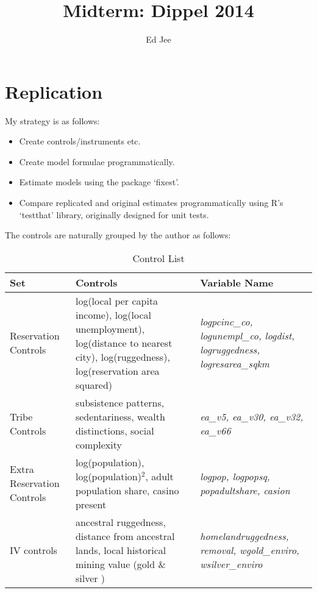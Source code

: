 \documentclass{article}
\author{Ed Jee}
\title{Midterm: Dippel 2014}
\begin{document}
\maketitle

\section{Replication}
My strategy is as follows:

\begin{itemize}
    \item Create controls/instruments etc.
    \item Create model formulae programmatically.
    \item Estimate models using the package `fixest'.
    \item Compare replicated and original estimates programmatically using
    R's `testthat' library, originally designed for unit tests.  
\end{itemize}

The controls are naturally grouped by the author as follows:

\begin{table}[htbp]
    \centering\begin{tabular}{| m{4cm} | m{5cm} | m{5cm} | }
        \hline 
    Set & Controls  & Variable Name\\ \hline\hline
    Reservation Controls & log(local per capita  income),
    log(local unemployment),
    log(distance to nearest city),
    log(ruggedness),
    log(reservation area squared) &
    \textit{
        logpcinc\_co,
        logunempl\_co,
        logdist,
        logruggedness,
        logresarea\_sqkm
    }  \\  \hline
    Tribe Controls & subsistence patterns,
    sedentariness,
    wealth distinctions,
    social complexity &
    \textit{
        ea\_v5,
        ea\_v30,
        ea\_v32,
        ea\_v66
    }\\ \hline
    Extra Reservation Controls & log(population),
    log(population)$^2$,
    adult population share,
    casino present &
    \textit{
        logpop,
        logpopsq,
        popadultshare,
        casion
    }\\ \hline
    IV controls & ancestral ruggedness,
    distance from ancestral lands,
    local historical mining value (gold \& silver  ) 
    & \textit{
        homelandruggedness,
        removal,
        wgold\_enviro,
        wsilver\_enviro
    }\\ 
    \hline
    
    \end{tabular}
    \caption{Control List}
    \label{controls}
\end{table}
\end{document}
